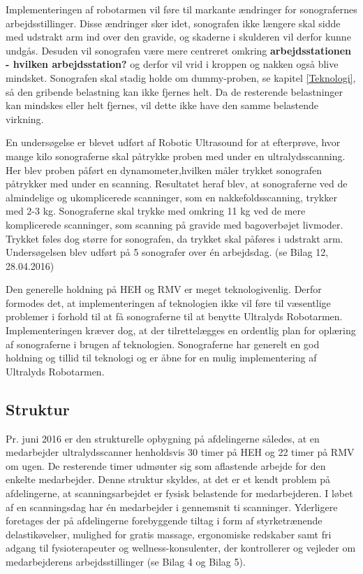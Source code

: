 Implementeringen af robotarmen vil føre til markante ændringer for sonografernes arbejdsstillinger. Disse ændringer sker idet, sonografen ikke længere skal sidde med udstrakt arm ind over den gravide, og skaderne i skulderen vil derfor kunne undgås. Desuden vil sonografen være mere centreret omkring \textbf{arbejdsstationen - hvilken arbejdsstation?} og derfor vil vrid i kroppen og nakken også blive mindsket. Sonografen skal stadig holde om dummy-proben, se kapitel \ref{Teknologi}, så den gribende belastning kan ikke fjernes helt. Da de resterende belastninger kan mindskes eller helt fjernes, vil dette ikke have den samme belastende virkning. 

En undersøgelse er blevet udført af Robotic Ultrasound for at efterprøve, hvor mange kilo sonograferne skal påtrykke proben med under en ultralydsscanning. Her blev proben påført en dynamometer,hvilken måler trykket sonografen påtrykker med under en scanning. Resultatet heraf blev, at sonograferne ved de almindelige og ukomplicerede scanninger, som en nakkefoldsscanning, trykker med 2-3 kg. Sonograferne skal trykke med omkring 11 kg ved de mere komplicerede scanninger, som scanning på gravide med bagoverbøjet livmoder. Trykket føles dog større for sonografen, da trykket skal påføres i udstrakt arm. Undersøgelsen blev udført på 5 sonografer over én arbejdsdag. (se Bilag 12, 28.04.2016)

Den generelle holdning på HEH og RMV er meget teknologivenlig. Derfor formodes det, at implementeringen af teknologien ikke vil føre til væsentlige problemer i forhold til at få sonograferne til at benytte Ultralyds Robotarmen. Implementeringen kræver dog, at der tilrettelægges en ordentlig plan for oplæring af sonograferne i brugen af teknologien. Sonograferne har generelt en god holdning og tillid til teknologi og er åbne for en mulig implementering af Ultralyds Robotarmen.

\subsection{Struktur}
Pr. juni 2016 er den strukturelle opbygning på afdelingerne således, at en medarbejder ultralydsscanner henholdsvis 30 timer på HEH og 22 timer på RMV om ugen. De resterende timer udmønter sig som aflastende arbejde for den enkelte medarbejder. Denne struktur skyldes, at det er et kendt problem på afdelingerne, at scanningsarbejdet er fysisk belastende for medarbejderen. I løbet af en scanningsdag har én medarbejder i gennemsnit ti scanninger. Yderligere foretages der på afdelingerne forebyggende tiltag i form af styrketrænende delastikøvelser, mulighed for gratis massage, ergonomiske redskaber samt fri adgang til fysioterapeuter og wellness-konsulenter, der kontrollerer og vejleder om medarbejderens arbejdsstillinger (se Bilag 4 og Bilag 5).

